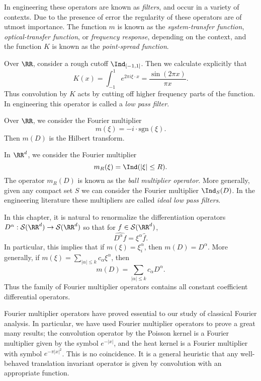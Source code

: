 \begin{remark}
  In engineering these operators are known as \emph{filters}, and occur in a variety of contexts. Due to the presence of error the regularity of these operators are of utmost importance. The function $m$ is known as the \emph{system-transfer function}, \emph{optical-transfer function}, or \emph{frequency response}, depending on the context, and the function $K$ is known as the \emph{point-spread function}.
\end{remark}

\begin{example}
  Over $\RR$, consider a rough cutoff $\Ind_{[-1,1]}$. Then we calculate explicitly that
  \[ K(x) = \int_{-1}^1 e^{2 \pi i \xi \cdot x} = \frac{\sin(2 \pi x)}{\pi x}. \]
  Thus convolution by $K$ acts by cutting off higher frequency parts of the function. In engineering this operator is called a \emph{low pass filter}.
\end{example}

\begin{example}
  Over $\RR$, we consider the Fourier multiplier
  \[ m(\xi) = - i \cdot \text{sgn}(\xi). \]
  Then $m(D)$ is the Hilbert transform.
\end{example}

\begin{example}
  In $\RR^d$, we consider the Fourier multiplier
  \[ m_R(\xi) = \Ind(|\xi| \leq R). \]
  The operator $m_R(D)$ is known as the \emph{ball multiplier operator}. More generally, given any compact set $S$ we can consider the Fourier multiplier $\Ind_S(D)$. In the engineering literature these multipliers are called \emph{ideal low pass filters}.
\end{example}

\begin{example}
  In this chapter, it is natural to renormalize the differentiation operators $D^\alpha: \mathcal{S}(\RR^d) \to \mathcal{S}(\RR^d)$ so that for $f \in \mathcal{S}(\RR^d)$,
  \[ \widehat{D^\alpha f} = \xi^\alpha \widehat{f}. \]
  In particular, this implies that if $m(\xi) = \xi_i^\alpha$, then $m(D) = D^\alpha$. More generally, if $m(\xi) = \sum_{|\alpha| \leq k} c_\alpha \xi^\alpha$, then
  \[ m(D) = \sum_{|\alpha| \leq k} c_\alpha D^\alpha. \]
  Thus the family of Fourier multiplier operators contains all constant coefficient differential operators.
\end{example}

Fourier multiplier operators have proved essential to our study of classical Fourier analysis. In particular, we have used Fourier multiplier operators to prove a great many results; the convolution operator by the Poisson kernel is a Fourier multiplier given by the symbol $e^{-|x|}$, and the heat kernel is a Fourier multiplier with symbol $e^{- \pi |x|^2}$. This is no coincidence. It is a general heuristic that any well-behaved translation invariant operator is given by convolution with an appropriate function.

